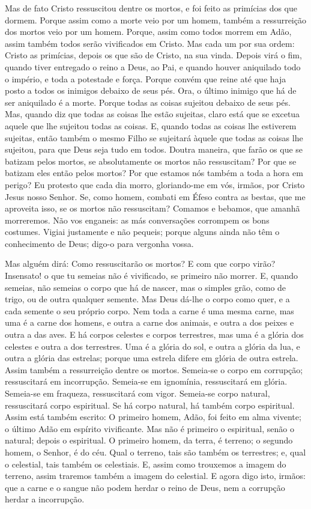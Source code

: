 Mas de fato Cristo ressuscitou dentre os mortos, e foi feito as
primícias dos que dormem. Porque assim como a morte veio por
um homem, também a ressurreição dos mortos veio por um homem.
Porque, assim como todos morrem em Adão, assim também todos
serão vivificados em Cristo. Mas cada um por sua ordem:
Cristo as primícias, depois os que são de Cristo, na sua vinda.
Depois virá o fim, quando tiver entregado o reino a Deus, ao
Pai, e quando houver aniquilado todo o império, e toda a potestade e
força. Porque convém que reine até que haja posto a todos os
inimigos debaixo de seus pés. Ora, o último inimigo que há de
ser aniquilado é a morte. Porque todas as coisas sujeitou
debaixo de seus pés. Mas, quando diz que todas as coisas lhe estão
sujeitas, claro está que se excetua aquele que lhe sujeitou todas as
coisas. E, quando todas as coisas lhe estiverem sujeitas,
então também o mesmo Filho se sujeitará àquele que todas as coisas
lhe sujeitou, para que Deus seja tudo em todos. Doutra
maneira, que farão os que se batizam pelos mortos, se absolutamente
os mortos não ressuscitam? Por que se batizam eles então pelos
mortos? Por que estamos nós também a toda a hora em perigo?
Eu protesto que cada dia morro, gloriando-me em vós, irmãos,
por Cristo Jesus nosso Senhor. Se, como homem, combati em
Éfeso contra as bestas, que me aproveita isso, se os mortos não
ressuscitam? Comamos e bebamos, que amanhã morreremos. Não
vos enganeis: as más conversações corrompem os bons costumes.
Vigiai justamente e não pequeis; porque alguns ainda não têm
o conhecimento de Deus; digo-o para vergonha vossa.

Mas alguém dirá: Como ressuscitarão os mortos? E com que corpo
virão? Insensato! o que tu semeias não é vivificado, se
primeiro não morrer. E, quando semeias, não semeias o corpo
que há de nascer, mas o simples grão, como de trigo, ou de outra
qualquer semente. Mas Deus dá-lhe o corpo como quer, e a cada
semente o seu próprio corpo. Nem toda a carne é uma mesma
carne, mas uma é a carne dos homens, e outra a carne dos animais, e
outra a dos peixes e outra a das aves. E há corpos celestes e
corpos terrestres, mas uma é a glória dos celestes e outra a dos
terrestres. Uma é a glória do sol, e outra a glória da lua, e
outra a glória das estrelas; porque uma estrela difere em glória de
outra estrela. Assim também a ressurreição dentre os mortos.
Semeia-se o corpo em corrupção; ressuscitará em incorrupção.
Semeia-se em ignomínia, ressuscitará em glória. Semeia-se em
fraqueza, ressuscitará com vigor. Semeia-se corpo natural,
ressuscitará corpo espiritual. Se há corpo natural, há também corpo
espiritual. Assim está também escrito: O primeiro homem,
Adão, foi feito em alma vivente; o último Adão em espírito
vivificante. Mas não é primeiro o espiritual, senão o
natural; depois o espiritual. O primeiro homem, da terra, é
terreno; o segundo homem, o Senhor, é do céu. Qual o terreno,
tais são também os terrestres; e, qual o celestial, tais também os
celestiais. E, assim como trouxemos a imagem do terreno,
assim traremos também a imagem do celestial. E agora digo
isto, irmãos: que a carne e o sangue não podem herdar o reino de
Deus, nem a corrupção herdar a incorrupção.


